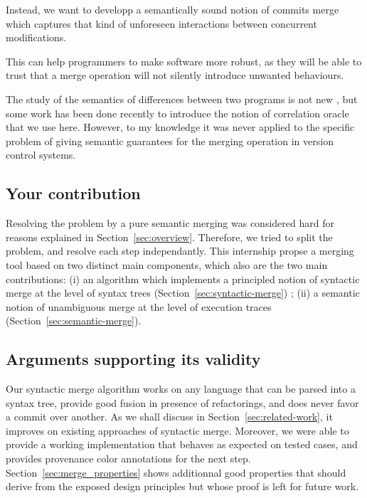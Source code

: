 \documentclass[a4paper,11pt]{article}
\newcommand\todo[1]{{\color{teal}(\textbf{TODO:} #1)}}
\begin{document}
Instead, we want to developp a semantically sound notion of commits 
merge which captures that kind of unforeseen interactions 
between concurrent modifications.

This can help programmers to make software more robust, as they will be able to trust that a merge operation will not silently introduce unwanted behaviours.

The study of the semantics of differences between two programs is not new \cite{benton2004simple}, but some work has been done recently to introduce the notion of correlation oracle \cite{girka2017verifiable} that we use here. However, to my knowledge it was never applied to the specific problem of giving semantic guarantees for the merging operation in version control systems.

\subsection*{Your contribution}


Resolving the problem by a pure semantic merging was considered hard for reasons explained in Section~\ref{sec:overview}. Therefore, we tried to split the problem, and resolve each step independantly.
This internship propse a merging tool based on two distinct main components, which also are the two main contributions: (i) an algorithm which implements a principled notion of
syntactic merge at the level of syntax trees (Section~\ref{sec:syntactic-merge}) ; (ii) a semantic notion of unambiguous merge
at the level of execution traces (Section~\ref{sec:semantic-merge}).

\subsection*{Arguments supporting its validity}


Our syntactic merge algorithm works on any language that can be parsed into a syntax tree, provide good fusion in presence of refactorings, and does never favor a commit over another. As we shall discuss in Section~\ref{sec:related-work}, it improves on existing approaches of syntactic merge. Moreover, we were able to provide a working implementation that behaves as expected on tested cases, and provides provenance color annotations for the next step.
Section~\ref{sec:merge_properties} shows additionnal good properties that should derive from the exposed design principles but whose proof is left for future work.
\end{document}
